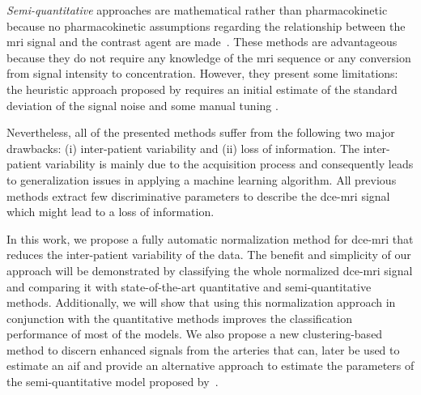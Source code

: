 \emph{Semi-quantitative} approaches are mathematical rather than pharmacokinetic because no pharmacokinetic assumptions regarding the relationship between the \ac{mri} signal and the contrast agent are made~\cite{huisman2001accurate,gliozzi2011phenomenological}.
These methods are advantageous because they do not require any knowledge of the \ac{mri} sequence or any conversion from signal intensity to concentration.
However, they present some limitations: the heuristic approach
proposed by \citeauthor{huisman2001accurate} requires an initial
estimate of the standard deviation of the signal noise and some manual tuning \cite{huisman2001accurate}.

Nevertheless, all of the presented methods suffer from the following two major drawbacks:
(i) inter-patient variability and (ii) loss of information.
The inter-patient variability is mainly due to the acquisition process
and consequently leads to generalization issues in applying a machine learning algorithm.
All previous methods extract few discriminative parameters to describe the \ac{dce}-\ac{mri} signal which might lead to a loss of information.

In this work, we propose a fully automatic normalization method for \ac{dce}-\ac{mri} that reduces the inter-patient variability of the data.
The benefit and simplicity of our approach will be demonstrated by
classifying the whole normalized \ac{dce}-\ac{mri} signal and
comparing it with state-of-the-art quantitative and semi-quantitative methods.
Additionally, we will show that using this normalization approach in conjunction with the quantitative methods improves the classification performance of most of the models.
We also propose a new clustering-based method to discern enhanced
signals from the arteries that can, later be used to estimate an
\ac{aif} and provide an alternative approach to estimate the parameters of the semi-quantitative model proposed by~\cite{huisman2001accurate}.


